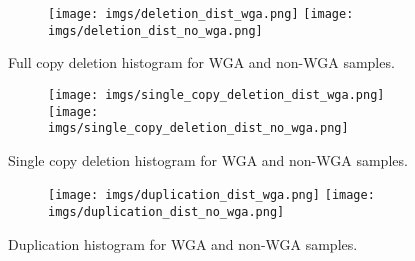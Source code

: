 \documentclass[12pt]{article}
\begin{document}
\begin{figure}[h]
	\begin{subfigure}{}
		\texttt{[image: imgs/deletion\_dist\_wga.png]}
		\texttt{[image: imgs/deletion\_dist\_no\_wga.png]}	
	\end{subfigure}
	
	\caption{Full copy deletion histogram for WGA and non-WGA samples.  }
	\label{fig:image1}
\end{figure}


\begin{figure}[h]
	\begin{subfigure}{}
		\texttt{[image: imgs/single\_copy\_deletion\_dist\_wga.png]}
		\texttt{[image: imgs/single\_copy\_deletion\_dist\_no\_wga.png]}	
	\end{subfigure}
	
	\caption{Single copy deletion histogram for WGA and non-WGA samples.  }
	\label{fig:image2}
\end{figure}


\begin{figure}[h]
	\begin{subfigure}{}
		\texttt{[image: imgs/duplication\_dist\_wga.png]}
		\texttt{[image: imgs/duplication\_dist\_no\_wga.png]}	
	\end{subfigure}
	
	\caption{Duplication histogram for WGA and non-WGA samples.  }
	\label{fig:image3}
\end{figure}
\end{document}
